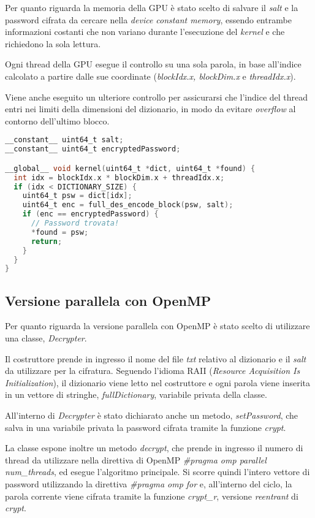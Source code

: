 \documentclass[10pt,twocolumn,letterpaper]{article}
\begin{document}
Per quanto riguarda la memoria della GPU è stato scelto di salvare il \textit{salt} e la password cifrata da cercare nella \textit{device constant memory}, essendo entrambe informazioni costanti che non variano durante l'esecuzione del \textit{kernel} e che richiedono la sola lettura.

Ogni thread della GPU esegue il controllo su una sola parola, in base all'indice calcolato a partire dalle sue coordinate (\textit{blockIdx.x, blockDim.x} e \textit{threadIdx.x}).

Viene anche eseguito un ulteriore controllo per assicurarsi che l'indice del thread entri nei limiti della dimensioni del dizionario, in modo da evitare \textit{overflow} al contorno dell'ultimo blocco.\newline


\begin{lstlisting}[basicstyle=\scriptsize, language=C, frame=single, caption={Esempio di kernel in CUDA},captionpos=b]
__constant__ uint64_t salt;
__constant__ uint64_t encryptedPassword;

__global__ void kernel(uint64_t *dict, uint64_t *found) {
  int idx = blockIdx.x * blockDim.x + threadIdx.x;
  if (idx < DICTIONARY_SIZE) {
    uint64_t psw = dict[idx];
    uint64_t enc = full_des_encode_block(psw, salt);
    if (enc == encryptedPassword) {
      // Password trovata!
      *found = psw;
      return;
    }
  }
}
\end{lstlisting}

\subsection{Versione parallela con OpenMP}
Per quanto riguarda la versione parallela con OpenMP è stato scelto di utilizzare una classe, \textit{Decrypter}.

Il costruttore prende in ingresso il nome del file \textit{txt} relativo al dizionario e il \textit{salt} da utilizzare per la cifratura. Seguendo l'idioma RAII (\textit{Resource Acquisition Is Initialization}), il dizionario viene letto nel costruttore e ogni parola viene inserita in un vettore di stringhe, \textit{fullDictionary}, variabile privata della classe.

All'interno di \textit{Decrypter} è stato dichiarato anche un metodo, \textit{setPassword}, che salva in una variabile privata la password cifrata tramite la funzione \textit{crypt}. 

La classe espone inoltre un metodo \textit{decrypt}, che prende in ingresso il numero di thread da utilizzare nella direttiva di OpenMP \textit{\#pragma omp parallel num\_threads}, ed esegue l'algoritmo principale. Si scorre quindi l'intero vettore di password utilizzando la direttiva \textit{\#pragma omp for} e, all'interno del ciclo, la parola corrente viene cifrata tramite la funzione \textit{crypt\_r}, versione \textit{reentrant} di \textit{crypt}.
\end{document}

